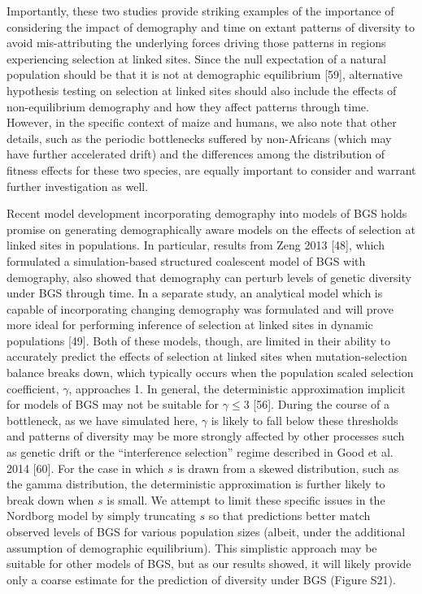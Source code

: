 \documentclass[9pt,twocolumn,twoside]{rilabRxiv}
\begin{document}
Importantly, these two studies provide striking examples of the
importance of considering the impact of demography and time on extant
patterns of diversity to avoid mis-attributing the underlying forces
driving those patterns in regions experiencing selection at linked
sites. Since the null expectation of a natural population should be that
it is not at demographic equilibrium [59], alternative hypothesis
testing on selection at linked sites should also include the effects of
non-equilibrium demography and how they affect patterns through time.
However, in the specific context of maize and humans, we also note that
other details, such as the periodic bottlenecks suffered by non-Africans
(which may have further accelerated drift) and the differences among the
distribution of fitness effects for these two species, are equally
important to consider and warrant further investigation as well.

Recent model development incorporating demography into models of BGS
holds promise on generating demographically aware models on the effects
of selection at linked sites in populations. In particular, results from
Zeng 2013 [48], which formulated a simulation-based structured
coalescent model of BGS with demography, also showed that demography can
perturb levels of genetic diversity under BGS through time. In a
separate study, an analytical model which is capable of incorporating
changing demography was formulated and will prove more ideal for
performing inference of selection at linked sites in dynamic populations
[49]. Both of these models, though, are limited in their ability to
accurately predict the effects of selection at linked sites when
mutation-selection balance breaks down, which typically occurs when the
population scaled selection coefficient, $\gamma$, approaches 1. In
general, the deterministic approximation implicit for models of BGS may
not be suitable for $\gamma \leq 3$ [56]. During the course of a
bottleneck, as we have simulated here, $\gamma$ is likely to fall below
these thresholds and patterns of diversity may be more strongly affected
by other processes such as genetic drift or the ``interference
selection'' regime described in Good et al. 2014 [60]. For the case
in which $s$ is drawn from a skewed distribution, such as the gamma
distribution, the deterministic approximation is further likely to break
down when $s$ is small. We attempt to limit these specific issues
in the Nordborg model by simply truncating $s$ so that predictions
better match observed levels of BGS for various population sizes
(albeit, under the additional assumption of demographic equilibrium).
This simplistic approach may be suitable for other models of BGS, but as
our results showed, it will likely provide only a coarse estimate for
the prediction of diversity under BGS (Figure S21).
\end{document}
